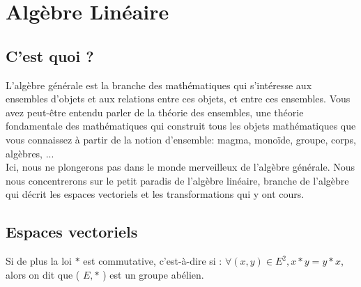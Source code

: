 \chapter{Algèbre Linéaire}

\section{C'est quoi ?}


L'algèbre générale est la branche des mathématiques qui s'intéresse aux ensembles d'objets et aux relations entre ces objets, et entre ces ensembles. Vous avez peut-être entendu parler de la théorie des ensembles, une théorie fondamentale des mathématiques qui construit tous les objets mathématiques que vous connaissez à partir de la notion d'ensemble: magma, monoïde, groupe, corps, algèbres, ...\\

Ici, nous ne plongerons pas dans le monde merveilleux de l'algèbre générale. Nous nous concentrerons sur le petit paradis de l'algèbre linéaire, branche de l'algèbre qui décrit les espaces vectoriels et les transformations qui y ont cours.

\section{Espaces vectoriels}

Si de plus la loi $*$ est commutative, c'est-à-dire si : $\forall(x, y) \in E^2, x * y=y * x$, alors on dit que ( $E, *$ ) est un groupe abélien.

